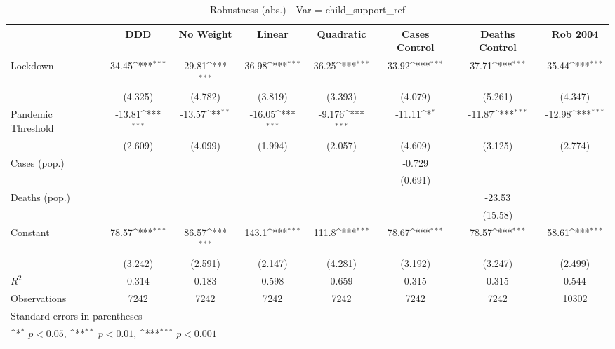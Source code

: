 \documentclass{article}
\begin{document}
{
\def\sym#1{\ifmmode^{#1}\else\(^{#1}\)\fi}
\begin{longtable}{l*{7}{c}}
\caption{Robustness (abs.) - Var = child\_support\_ref}\\
\hline\hline\endfirsthead\hline\endhead\hline\endfoot\endlastfoot
                &\multicolumn{1}{c}{DDD}&\multicolumn{1}{c}{No Weight}&\multicolumn{1}{c}{Linear}&\multicolumn{1}{c}{Quadratic}&\multicolumn{1}{c}{Cases Control}&\multicolumn{1}{c}{Deaths Control}&\multicolumn{1}{c}{Rob 2004}\\
\hline
Lockdown        &    34.45\sym{***}&    29.81\sym{***}&    36.98\sym{***}&    36.25\sym{***}&    33.92\sym{***}&    37.71\sym{***}&    35.44\sym{***}\\
                &  (4.325)         &  (4.782)         &  (3.819)         &  (3.393)         &  (4.079)         &  (5.261)         &  (4.347)         \\
Pandemic Threshold&   -13.81\sym{***}&   -13.57\sym{**} &   -16.05\sym{***}&   -9.176\sym{***}&   -11.11\sym{*}  &   -11.87\sym{***}&   -12.98\sym{***}\\
                &  (2.609)         &  (4.099)         &  (1.994)         &  (2.057)         &  (4.609)         &  (3.125)         &  (2.774)         \\
Cases (pop.)    &                  &                  &                  &                  &   -0.729         &                  &                  \\
                &                  &                  &                  &                  &  (0.691)         &                  &                  \\
Deaths (pop.)   &                  &                  &                  &                  &                  &   -23.53         &                  \\
                &                  &                  &                  &                  &                  &  (15.58)         &                  \\
Constant        &    78.57\sym{***}&    86.57\sym{***}&    143.1\sym{***}&    111.8\sym{***}&    78.67\sym{***}&    78.57\sym{***}&    58.61\sym{***}\\
                &  (3.242)         &  (2.591)         &  (2.147)         &  (4.281)         &  (3.192)         &  (3.247)         &  (2.499)         \\
\hline
\(R^{2}\)       &    0.314         &    0.183         &    0.598         &    0.659         &    0.315         &    0.315         &    0.544         \\
Observations    &     7242         &     7242         &     7242         &     7242         &     7242         &     7242         &    10302         \\
\hline\hline
\multicolumn{8}{l}{\footnotesize Standard errors in parentheses}\\
\multicolumn{8}{l}{\footnotesize \sym{*} \(p<0.05\), \sym{**} \(p<0.01\), \sym{***} \(p<0.001\)}\\
\end{longtable}
}
\end{document}
